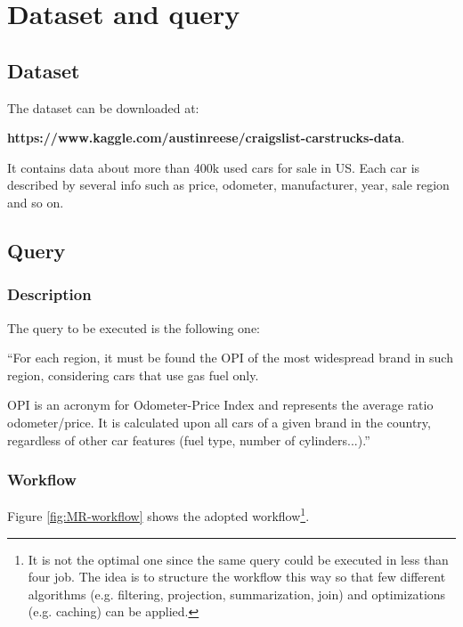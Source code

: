 \chapter{Dataset and query}

\section{Dataset}

The dataset can be downloaded at: 

\bigskip

\begin{center}
  \textbf{https://www.kaggle.com/austinreese/craigslist-carstrucks-data}.
\end{center}

\bigskip

It contains data about more than 400k used cars for sale in US.
Each car is described by several info such as price, odometer, manufacturer, year, sale region and so on.

\section{Query}

\subsection{Description}

The query to be executed is the following one:

\bigskip

``For each region, it must be found the OPI of the most widespread brand in such region, considering cars that use gas fuel only. 

OPI is an acronym for Odometer-Price Index and represents the average ratio odometer/price. It is calculated upon all cars of a given brand in the country, regardless of other car features (fuel type, number of cylinders...).''

\subsection{Workflow}\label{workflow}

Figure \ref{fig:MR-workflow} shows the adopted workflow\footnote{It is not the optimal one since the same query could be executed in less than four job. The idea is to structure the workflow this way so that few different algorithms (e.g. filtering, projection, summarization, join) and optimizations (e.g. caching) can be applied. }.

